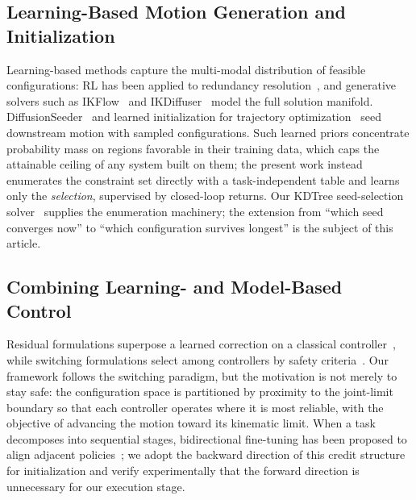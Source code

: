 \documentclass[journal]{IEEEtran}
\begin{document}
\subsection{Learning-Based Motion Generation and Initialization}
Learning-based methods capture the multi-modal distribution of feasible
configurations: RL has been applied to redundancy
resolution~\cite{malik2022deep}, and generative solvers such as
IKFlow~\cite{ames2022ikflow} and IKDiffuser~\cite{zhang2025ikdiffuser}
model the full solution manifold. DiffusionSeeder~\cite{huang2024diffusionseeder}
and learned initialization for trajectory
optimization~\cite{yoon2023learning} seed downstream motion with sampled
configurations. Such learned priors concentrate probability mass on
regions favorable in their training data, which caps the attainable
ceiling of any system built on them; the present work instead
enumerates the constraint set directly with a task-independent table and
learns only the \textit{selection}, supervised by closed-loop returns.
Our KDTree seed-selection solver~\cite{yuan2026iksel} supplies the
enumeration machinery; the extension from ``which seed converges now''
to ``which configuration survives longest'' is the subject of this
article.

\subsection{Combining Learning- and Model-Based Control}
Residual formulations superpose a learned correction on a classical
controller~\cite{johannink2019residual,silver2018residual}, while
switching formulations select among controllers by safety
criteria~\cite{mehmood2022black,alshiekh2018safe,kurtz2021control}. Our
framework follows the switching paradigm, but the motivation is not
merely to stay safe: the configuration space is partitioned by proximity
to the joint-limit boundary so that each controller operates where it is
most reliable, with the objective of advancing the motion toward its
kinematic limit. When a task decomposes into sequential stages,
bidirectional fine-tuning has been proposed to align adjacent
policies~\cite{chen2023sequential}; we adopt the backward direction of
this credit structure for initialization and verify experimentally that
the forward direction is unnecessary for our execution stage.
\end{document}
